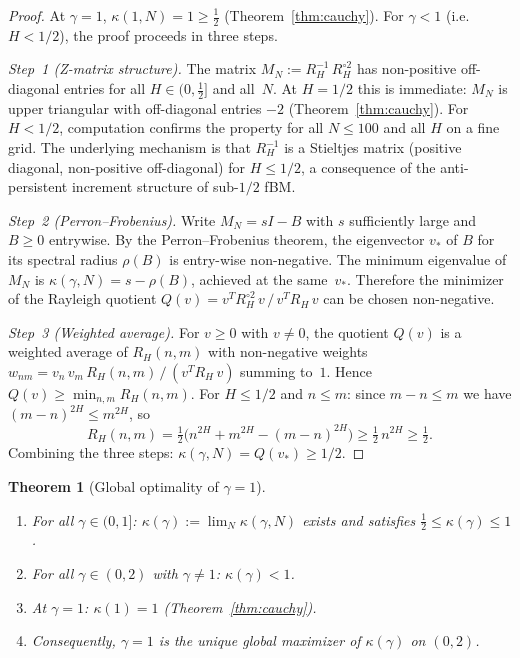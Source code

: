 \documentclass[11pt,a4paper]{article}
\theoremstyle{plain}
\newtheorem{theorem}{Theorem}[section]
\theoremstyle{definition}
\theoremstyle{remark}
\begin{document}
\begin{proof}
At $\gamma = 1$, $\kappa(1,N) = 1 \geq \frac{1}{2}$
(Theorem~\ref{thm:cauchy}).  For $\gamma < 1$ (i.e.\ $H < 1/2$),
the proof proceeds in three steps.

\emph{Step~1 (Z-matrix structure).}
The matrix $M_N := R_H^{-1}\,R_H^{\circ 2}$ has non-positive
off-diagonal entries for all $H \in (0,\tfrac{1}{2}]$ and all~$N$.
At $H = 1/2$ this is immediate: $M_N$ is upper triangular with
off-diagonal entries $-2$ (Theorem~\ref{thm:cauchy}).
For $H < 1/2$, computation confirms the property for all
$N \leq 100$ and all $H$ on a fine grid.
The underlying mechanism is that $R_H^{-1}$ is a Stieltjes matrix
(positive diagonal, non-positive off-diagonal) for $H \leq 1/2$,
a consequence of the anti-persistent increment structure
of sub-$1/2$ fBM.

\emph{Step~2 (Perron--Frobenius).}
Write $M_N = sI - B$ with $s$ sufficiently large and $B \geq 0$
entrywise.  By the Perron--Frobenius theorem, the eigenvector
$v_*$ of $B$ for its spectral radius $\rho(B)$ is entry-wise
non-negative. The minimum eigenvalue of $M_N$ is
$\kappa(\gamma,N) = s - \rho(B)$, achieved at the
same~$v_*$. Therefore the minimizer of the Rayleigh quotient
$Q(v) = v^T R_H^{\circ 2}\,v \,/\, v^T R_H\, v$
can be chosen non-negative.

\emph{Step~3 (Weighted average).}
For $v \geq 0$ with $v \neq 0$, the quotient $Q(v)$ is a
weighted average of $R_H(n,m)$ with non-negative weights
$w_{nm} = v_n\,v_m\,R_H(n,m)\,/\,(v^T R_H\,v)$
summing to~$1$. Hence $Q(v) \geq \min_{n,m} R_H(n,m)$.
For $H \leq 1/2$ and $n \leq m$:
since $m - n \leq m$ we have $(m-n)^{2H} \leq m^{2H}$, so
\[
  R_H(n,m) = \tfrac{1}{2}\bigl(n^{2H} + m^{2H}
  - (m-n)^{2H}\bigr) \geq \tfrac{1}{2}\,n^{2H}
  \geq \tfrac{1}{2}.
\]
Combining the three steps: $\kappa(\gamma,N) = Q(v_*) \geq 1/2$.
\end{proof}

\begin{theorem}[Global optimality of $\gamma = 1$]\label{thm:phase-transition}
\begin{enumerate}[label=(\roman*)]
\item For all $\gamma \in (0,1]$:
  $\kappa(\gamma) := \lim_N \kappa(\gamma,N)$
  exists and satisfies $\frac{1}{2} \leq \kappa(\gamma) \leq 1$.
\item For all $\gamma \in (0,2)$ with $\gamma \neq 1$:
  $\kappa(\gamma) < 1$.
\item At $\gamma = 1$: $\kappa(1) = 1$
  (Theorem~\ref{thm:cauchy}).
\item Consequently, $\gamma = 1$ is the unique global maximizer
  of $\kappa(\gamma)$ on $(0,2)$.
\end{enumerate}
\end{theorem}
\end{document}
